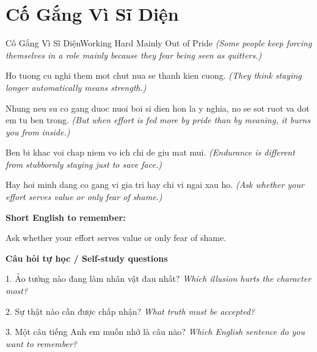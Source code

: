 \section{Cố Gắng Vì Sĩ Diện}
\begin{truyen}{Cố Gắng Vì Sĩ Diện}{Working Hard Mainly Out of Pride}
\textit{(Some people keep forcing themselves in a role mainly because they fear being seen as quitters.)}

Ho tuong cu nghi them mot chut nua se thanh kien cuong.
\textit{(They think staying longer automatically means strength.)}

Nhung neu su co gang duoc nuoi boi si dien hon la y nghia, no se sot ruot va dot em tu ben trong.
\textit{(But when effort is fed more by pride than by meaning, it burns you from inside.)}

Ben bi khac voi chap niem vo ich chi de giu mat mui.
\textit{(Endurance is different from stubbornly staying just to save face.)}

\end{truyen}

\begin{baihoc}
Hay hoi minh dang co gang vi gia tri hay chi vi ngai xau ho.
\textit{(Ask whether your effort serves value or only fear of shame.)}
\end{baihoc}

\begin{ghinhoanh}
\textbf{Short English to remember:}

Ask whether your effort serves value or only fear of shame.

\end{ghinhoanh}

\begin{tuhocnhanh}
\textbf{Câu hỏi tự học / Self-study questions}

1. Ảo tưởng nào đang làm nhân vật đau nhất? \textit{Which illusion hurts the character most?}

2. Sự thật nào cần được chấp nhận? \textit{What truth must be accepted?}

3. Một câu tiếng Anh em muốn nhớ là câu nào? \textit{Which English sentence do you want to remember?}
\end{tuhocnhanh}
\ngancach

